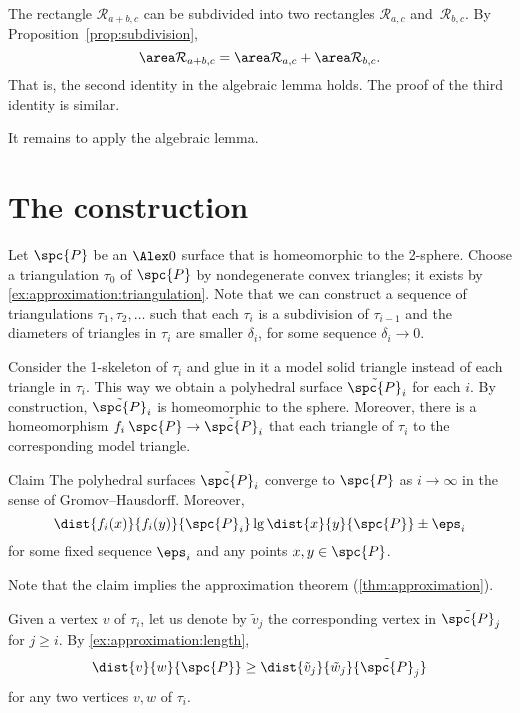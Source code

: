 The rectangle $\mathcal{R}_{a+b,c}$
can be subdivided into two rectangles $\mathcal{R}_{a,c}$
and~$\mathcal{R}_{b,c}$.
By Proposition~\ref{prop:subdivision},
\[
\area \mathcal{R}_{a+b,c}=\area \mathcal{R}_{a,c}+\area \mathcal{R}_{b,c}.
\]
That is, the second identity in the algebraic lemma holds.
The proof of the third identity is similar.

It remains to apply the algebraic lemma.
\qeds














\section{The construction}

Let $\spc{P}$ be an $\Alex0$ surface that is homeomorphic to the 2-sphere.
Choose a triangulation $\tau_0$ of $\spc{P}$ by nondegenerate convex triangles; it exists by \ref{ex:approximation:triangulation}.
Note that we can construct a sequence of triangulations $\tau_1,\tau_2,\dots$ such that each $\tau_i$ is a subdivision of $\tau_{i-1}$ and the diameters of triangles in $\tau_i$ are smaller $\delta_i$, for some sequence $\delta_i\to 0$.

Consider the 1-skeleton of $\tau_i$ and glue in it a model solid triangle instead of each triangle in $\tau_i$.
This way we obtain a polyhedral surface $\tilde{\spc{P}}_i$ for each $i$.
By construction, $\tilde{\spc{P}}_i$ is homeomorphic to the sphere.
Moreover, there is a homeomorphism $f_i\:\spc{P}\to\tilde{\spc{P}}_i$ that each triangle of $\tau_i$ to the corresponding model triangle.


\begin{thm}{Claim}
The polyhedral surfaces $\tilde{\spc{P}}_i$ converge to $\spc{P}$ as $i\to\infty$ in the sense of Gromov--Hausdorff.
Moreover,
\[\dist{f_i(x)}{f_i(y)}{\spc{P}_i}\lg\dist{x}{y}{\spc{P}}\pm\eps_i\]
for some fixed sequence $\eps_i$ and any points $x,y\in \spc{P}$.
\end{thm}

Note that the claim implies the approximation theorem (\ref{thm:approximation}).

Given a vertex $v$ of $\tau_i$, let us denote by $\tilde v_j$ the corresponding vertex in $\tilde{\spc{P}}_j$ for $j\ge i$.
By \ref{ex:approximation:length},
\[\dist{v}{w}{\spc{P}}\ge \dist{\tilde v_j}{\tilde w_j}{\tilde{\spc{P}}_j}\]
for any two vertices $v,w$ of $\tau_i$.

